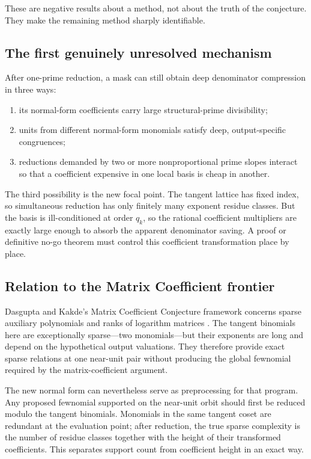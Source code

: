 \documentclass[11pt,oneside]{article}
\theoremstyle{definition}
\theoremstyle{remark}
\begin{document}
These are negative results about a method, not about the truth of the conjecture.  They make
the remaining method sharply identifiable.

\subsection{The first genuinely unresolved mechanism}

After one-prime reduction, a mask can still obtain deep denominator compression in three
ways:

\begin{enumerate}
\item its normal-form coefficients carry large structural-prime divisibility;
\item units from different normal-form monomials satisfy deep, output-specific congruences;
\item reductions demanded by two or more nonproportional prime slopes interact so that a
coefficient expensive in one local basis is cheap in another.
\end{enumerate}

The third possibility is the new focal point.  The tangent lattice has fixed index, so
simultaneous reduction has only finitely many exponent residue classes.  But the basis is
ill-conditioned at order $q_k$, so the rational coefficient multipliers are exactly large
enough to absorb the apparent denominator saving.  A proof or definitive no-go theorem must
control this coefficient transformation place by place.

\subsection{Relation to the Matrix Coefficient frontier}

Dasgupta and Kakde's Matrix Coefficient Conjecture framework concerns sparse auxiliary
polynomials and ranks of logarithm matrices \cite{DasguptaKakde2026}.  The tangent binomials
here are exceptionally sparse---two monomials---but their exponents are long and depend on the
hypothetical output valuations.  They therefore provide exact sparse relations at one
near-unit pair without producing the global fewnomial required by the matrix-coefficient
argument.

The new normal form can nevertheless serve as preprocessing for that program.  Any proposed
fewnomial supported on the near-unit orbit should first be reduced modulo the tangent
binomials.  Monomials in the same tangent coset are redundant at the evaluation point; after
reduction, the true sparse complexity is the number of residue classes together with the
height of their transformed coefficients.  This separates support count from coefficient
height in an exact way.
\end{document}
